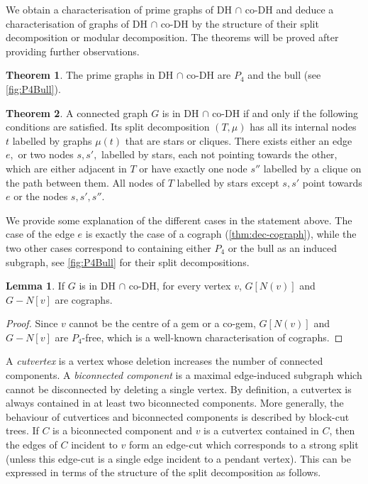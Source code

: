 \documentclass{amsart}
\def\DHcoDH{DH $\cap$ co-DH}
\theoremstyle{definition}
\newtheorem{lemma}{Lemma}
\newtheorem{theorem}{Theorem}
\begin{document}
We obtain a characterisation of prime graphs of \DHcoDH{} and deduce a
characterisation of graphs of \DHcoDH{} by the structure of their split
decomposition or modular decomposition. The theorems will be proved after
providing further observations.

\begin{theorem}\label{thm:prime-DHcoDH}
	 The prime graphs in \DHcoDH{} are $P_4$ and the bull (see \cref{fig:P4Bull}).
\end{theorem}

\begin{theorem}\label{thm:dec-DHcoDH}
	A connected graph $G$ is in \DHcoDH{} if and only if the following
	conditions are satisfied. Its split decomposition $(T,\mu)$ has all its
	internal nodes $t$ labelled by graphs $\mu(t)$ that are stars or
	cliques. There exists either an edge $e,$ or two nodes $s,s',$ labelled by
	stars, each not pointing towards the other, which are either adjacent in $T$ or
	have exactly one node $s''$ labelled by a clique on the path between them.
	All nodes of $T$ labelled by stars except $s,s'$ point towards $e$ or the
	nodes $s,s',s''$.
\end{theorem}

We provide some explanation of the different cases in the statement above. The
case of the edge $e$ is exactly the case of a cograph (\cref{thm:dec-cograph}),
while the two other cases correspond to containing either $P_4$ or the bull as
an induced subgraph, see \cref{fig:P4Bull} for their split decompositions.

\begin{lemma}\label{lem:subcographs}
If $G$ is in \DHcoDH{}, for every vertex $v$, $G[N(v)]$ and $G-N[v]$ are cographs.
\end{lemma}

\begin{proof}
Since $v$ cannot be the centre of a gem or a co-gem, $G[N(v)]$ and $G-N[v]$ are
$P_4$-free, which is a well-known characterisation of cographs.
\end{proof}

A \emph{cutvertex} is a vertex whose deletion increases the number of
connected components. A \emph{biconnected component} is a maximal edge-induced
subgraph which cannot be disconnected by deleting a single vertex. By
definition, a cutvertex is always contained in at least two biconnected
components. More generally, the behaviour of cutvertices and biconnected
components is described by block-cut trees. If $C$ is a biconnected component
and $v$ is a cutvertex contained in $C$, then the edges of $C$ incident to $v$
form an edge-cut which corresponds to a strong split (unless this edge-cut is a
single edge incident to a pendant vertex). This can be expressed in terms of
the structure of the split decomposition as follows.
\end{document}

